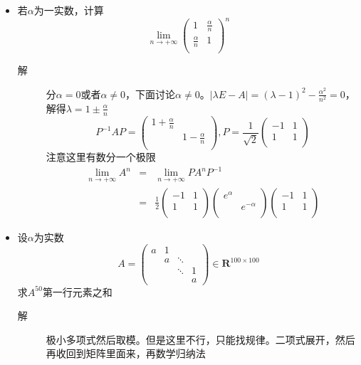 \begin{itemize}
\item 若$\alpha$为一实数，计算
\[
\lim_{n \to +\infty}\left(
\begin{array}{cc}
1 & \frac{\alpha}{n}\\
\frac{\alpha}{n} & 1 \\
\end{array}
\right)^n
\]
\begin{description}
\item[解] 分$\alpha=0$或者$\alpha\neq 0$，下面讨论$\alpha\neq 0$。$|\lambda E-A|=(\lambda-1)^2-\frac{\alpha^2}{n^2}=0$，解得$\lambda=1 \pm \frac{\alpha}{n}$
\[
P^{-1}AP=\left(
\begin{array}{cc}
1+\frac{\alpha}{n} & \\
 & 1-\frac{\alpha}{n} \\
\end{array}
\right),
P=\frac{1}{\sqrt{2}}\left(
\begin{array}{cc}
-1 & 1\\
1 & 1\\
\end{array}
\right)
\]
注意这里有数分一个极限
\begin{eqnarray*}
\lim_{n \to +\infty} A^n &=& \lim_{n \to +\infty} PA^nP^{-1}\\
&=& \frac{1}{2} \left(
\begin{array}{cc}
-1 & 1\\
1 & 1\\
\end{array}
\right)
\left(
\begin{array}{cc}
e^\alpha & \\
 & e^{-\alpha} \\
 \end{array}
\right)
\left(
\begin{array}{cc}
-1 & 1\\
1 & 1\\
\end{array}
\right)
\end{eqnarray*}
\end{description}


\item 设$\alpha$为实数
\[
A=\left(
\begin{array}{cccc}
a & 1 & & \\
 & a & \ddots & \\
 & & \ddots & 1 \\
 & & & a
\end{array}
\right) \in \mathbf{R}^{100 \times 100}
\]
求$A^{50}$第一行元素之和
\begin{description}
\item[解] 极小多项式然后取模。但是这里不行，只能找规律。二项式展开，然后再收回到矩阵里面来，再数学归纳法
\end{description}



\end{itemize}
